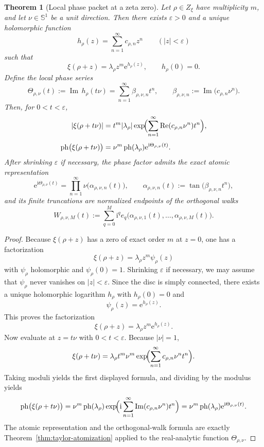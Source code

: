 \documentclass[11pt,a4paper]{article}
\numberwithin{equation}{section}
\newtheorem{theorem}{Theorem}[section]
\theoremstyle{definition}
\theoremstyle{remark}
\DeclareMathOperator{\Rea}{Re}
\DeclareMathOperator{\Ima}{Im}
\newcommand{\Sph}{\mathbb S^1}
\newcommand{\ph}{\operatorname{ph}}
\newcommand{\e}{\mathrm e}
\newcommand{\ii}{\mathrm i}
\begin{document}
\begin{theorem}[Local phase packet at a zeta zero]\label{thm:local-phase-packet}
Let $\rho\in Z_\xi$ have multiplicity $m$, and let $\nu\in\Sph$ be a unit direction.  Then there exists $\varepsilon>0$ and a unique holomorphic function
\[
h_\rho(z)=\sum_{n=1}^{\infty} c_{\rho,n} z^n
\qquad (|z|<\varepsilon)
\]
such that
\[
\xi(\rho+z)=\lambda_\rho z^m \e^{h_\rho(z)},
\qquad h_\rho(0)=0.
\]
Define the local phase series
\[
\Theta_{\rho,\nu}(t):=\Ima\,h_\rho(t\nu)
=\sum_{n=1}^{\infty}\beta_{\rho,\nu,n} t^n,
\qquad
\beta_{\rho,\nu,n}:=\Ima\bigl(c_{\rho,n}\nu^n\bigr).
\]
Then, for $0<t<\varepsilon$,
\begin{align*}
|\xi(\rho+t\nu)|
&=t^m |\lambda_\rho| \exp\!\Bigl(\sum_{n=1}^{\infty}\Rea(c_{\rho,n}\nu^n)t^n\Bigr),\\[4pt]
\ph\bigl(\xi(\rho+t\nu)\bigr)
&=\nu^m\ph(\lambda_\rho)\e^{\ii\Theta_{\rho,\nu}(t)}.
\end{align*}
After shrinking $\varepsilon$ if necessary, the phase factor admits the exact atomic representation
\[
\e^{\ii\Theta_{\rho,\nu}(t)}
=\prod_{n=1}^{\infty}\nu\bigl(\alpha_{\rho,\nu,n}(t)\bigr),
\qquad
\alpha_{\rho,\nu,n}(t):=\tan\bigl(\beta_{\rho,\nu,n}t^n\bigr),
\]
and its finite truncations are normalized endpoints of the orthogonal walks
\[
W_{\rho,\nu,M}(t):=
\sum_{q=0}^M \ii^q e_q\bigl(\alpha_{\rho,\nu,1}(t),\dots,\alpha_{\rho,\nu,M}(t)\bigr).
\]
\end{theorem}

\begin{proof}
Because $\xi(\rho+z)$ has a zero of exact order $m$ at $z=0$, one has a factorization
\[
\xi(\rho+z)=\lambda_\rho z^m \psi_\rho(z)
\]
with $\psi_\rho$ holomorphic and $\psi_\rho(0)=1$.  Shrinking $\varepsilon$ if necessary, we may assume that $\psi_\rho$ never vanishes on $|z|<\varepsilon$.  Since the disc is simply connected, there exists a unique holomorphic logarithm $h_\rho$ with $h_\rho(0)=0$ and
\[
\psi_\rho(z)=\e^{h_\rho(z)}.
\]
This proves the factorization
\[
\xi(\rho+z)=\lambda_\rho z^m \e^{h_\rho(z)}.
\]
Now evaluate at $z=t\nu$ with $0<t<\varepsilon$.  Because $|\nu|=1$,
\[
\xi(\rho+t\nu)=\lambda_\rho t^m \nu^m \exp\!\Bigl(\sum_{n=1}^{\infty} c_{\rho,n}\nu^n t^n\Bigr).
\]
Taking moduli yields the first displayed formula, and dividing by the modulus yields
\[
\ph\bigl(\xi(\rho+t\nu)\bigr)=\nu^m\ph(\lambda_\rho)\exp\!\Bigl(\ii\sum_{n=1}^{\infty}\Ima(c_{\rho,n}\nu^n)t^n\Bigr)
=\nu^m\ph(\lambda_\rho)\e^{\ii\Theta_{\rho,\nu}(t)}.
\]
The atomic representation and the orthogonal-walk formula are exactly Theorem~\ref{thm:taylor-atomization} applied to the real-analytic function $\Theta_{\rho,\nu}$.
\end{proof}
\end{document}
